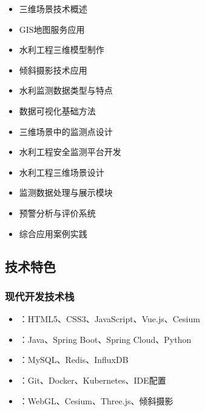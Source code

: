
\begin{itemize}
\tightlist
\item
  三维场景技术概述
\item
  GIS地图服务应用
\item
  水利工程三维模型制作
\item
  倾斜摄影技术应用
\end{itemize}


\begin{itemize}
\tightlist
\item
  水利监测数据类型与特点
\item
  数据可视化基础方法
\item
  三维场景中的监测点设计
\end{itemize}


\begin{itemize}
\tightlist
\item
  水利工程安全监测平台开发
\item
  水利工程三维场景设计
\item
  监测数据处理与展示模块
\item
  预警分析与评价系统
\item
  综合应用案例实践
\end{itemize}

\hypertarget{ux6280ux672fux7279ux8272}{%
\subsection{技术特色}\label{ux6280ux672fux7279ux8272}}

\hypertarget{ux73b0ux4ee3ux5f00ux53d1ux6280ux672fux6808}{%
\subsubsection{现代开发技术栈}\label{ux73b0ux4ee3ux5f00ux53d1ux6280ux672fux6808}}

\begin{itemize}
\tightlist
\item
  ：HTML5、CSS3、JavaScript、Vue.js、Cesium
\item
  ：Java、Spring Boot、Spring Cloud、Python
\item
  ：MySQL、Redis、InfluxDB
\item
  ：Git、Docker、Kubernetes、IDE配置
\item
  ：WebGL、Cesium、Three.js、倾斜摄影
\end{itemize}

